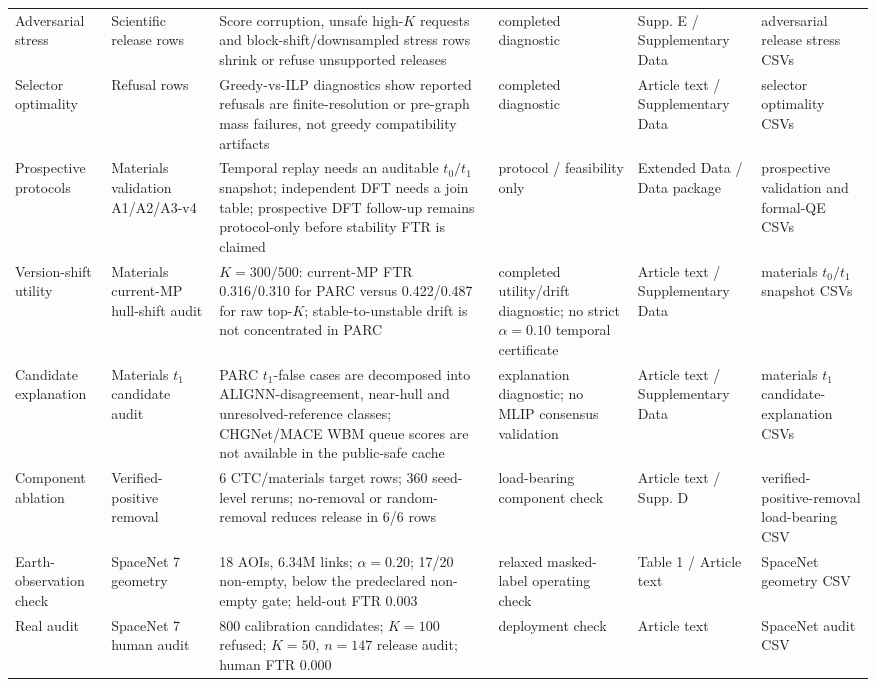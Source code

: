 \documentclass[11pt]{article}
\begin{document}
\begin{table}[h]
{\begin{tabular}{llllll}
Adversarial stress & Scientific release rows & Score corruption, unsafe high-\(K\) requests and block-shift/downsampled stress rows shrink or refuse unsupported releases & completed diagnostic & Supp. E / Supplementary Data & adversarial release stress CSVs \\
Selector optimality & Refusal rows & Greedy-vs-ILP diagnostics show reported refusals are finite-resolution or pre-graph mass failures, not greedy compatibility artifacts & completed diagnostic & Article text / Supplementary Data & selector optimality CSVs \\
Prospective protocols & Materials validation A1/A2/A3-v4 & Temporal replay needs an auditable \(t_0/t_1\) snapshot; independent DFT needs a join table; prospective DFT follow-up remains protocol-only before stability FTR is claimed & protocol / feasibility only & Extended Data / Data package & prospective validation and formal-QE CSVs \\
Version-shift utility & Materials current-MP hull-shift audit & \(K=300/500\): current-MP FTR 0.316/0.310 for PARC versus 0.422/0.487 for raw top-\(K\); stable-to-unstable drift is not concentrated in PARC & completed utility/drift diagnostic; no strict \(\alpha=0.10\) temporal certificate & Article text / Supplementary Data & materials \(t_0/t_1\) snapshot CSVs \\
Candidate explanation & Materials \(t_1\) candidate audit & PARC \(t_1\)-false cases are decomposed into ALIGNN-disagreement, near-hull and unresolved-reference classes; CHGNet/MACE WBM queue scores are not available in the public-safe cache & explanation diagnostic; no MLIP consensus validation & Article text / Supplementary Data & materials \(t_1\) candidate-explanation CSVs \\
Component ablation & Verified-positive removal & 6 CTC/materials target rows; 360 seed-level reruns; no-removal or random-removal reduces release in 6/6 rows & load-bearing component check & Article text / Supp. D & verified-positive-removal load-bearing CSV \\
Earth-observation check & SpaceNet 7 geometry & 18 AOIs, 6.34M links; \(\alpha=0.20\); 17/20 non-empty, below the predeclared non-empty gate; held-out FTR 0.003 & relaxed masked-label operating check & Table 1 / Article text & SpaceNet geometry CSV \\
Real audit & SpaceNet 7 human audit & 800 calibration candidates; \(K=100\) refused; \(K=50\), \(n=147\) release audit; human FTR 0.000 & deployment check & Article text & SpaceNet audit CSV \\

\end{tabular}}
\end{table}
\end{document}

